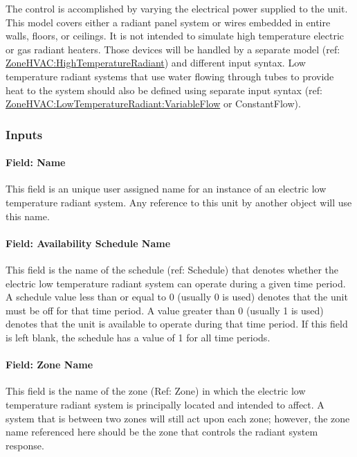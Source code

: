 The control is accomplished by varying the electrical power supplied to the unit. This model covers either a radiant panel system or wires embedded in entire walls, floors, or ceilings. It is not intended to simulate high temperature electric or gas radiant heaters. Those devices will be handled by a separate model (ref: \hyperref[zonehvachightemperatureradiant]{ZoneHVAC:HighTemperatureRadiant}) and different input syntax. Low temperature radiant systems that use water flowing through tubes to provide heat to the system should also be defined using separate input syntax (ref: \hyperref[zonehvaclowtemperatureradiantvariableflow]{ZoneHVAC:LowTemperatureRadiant:VariableFlow} or ConstantFlow).

\subsubsection{Inputs}\label{inputs-7-019}

\paragraph{Field: Name}\label{field-name-7-015}

This field is an unique user assigned name for an instance of an electric low temperature radiant system. Any reference to this unit by another object will use this name.

\paragraph{Field: Availability Schedule Name}\label{field-availability-schedule-name-7-003}

This field is the name of the schedule (ref: Schedule) that denotes whether the electric low temperature radiant system can operate during a given time period. A schedule value less than or equal to 0 (usually 0 is used) denotes that the unit must be off for that time period. A value greater than 0 (usually 1 is used) denotes that the unit is available to operate during that time period. If this field is left blank, the schedule has a value of 1 for all time periods.

\paragraph{Field: Zone Name}\label{field-zone-name-2-005}

This field is the name of the zone (Ref: Zone) in which the electric low temperature radiant system is principally located and intended to affect. A system that is between two zones will still act upon each zone; however, the zone name referenced here should be the zone that controls the radiant system response.

